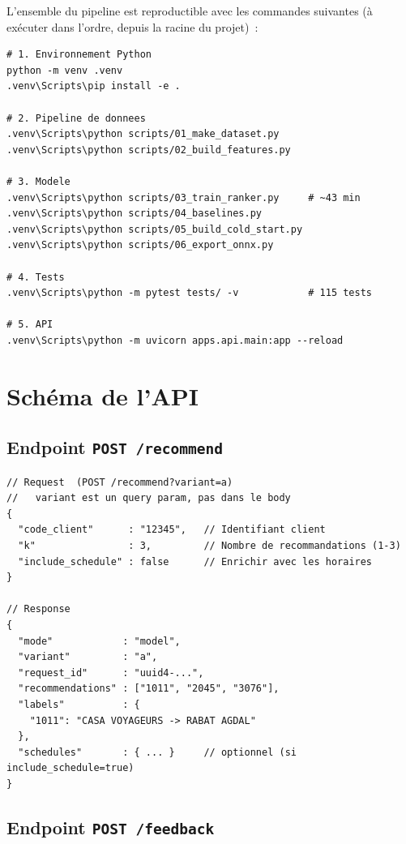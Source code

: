 \documentclass[12pt, a4paper]{report}
\begin{document}
L'ensemble du pipeline est reproductible avec les commandes suivantes
(à exécuter dans l'ordre, depuis la racine du projet)~:

\begin{lstlisting}[style=bash, caption={Pipeline de reproduction complet}]
# 1. Environnement Python
python -m venv .venv
.venv\Scripts\pip install -e .

# 2. Pipeline de donnees
.venv\Scripts\python scripts/01_make_dataset.py
.venv\Scripts\python scripts/02_build_features.py

# 3. Modele
.venv\Scripts\python scripts/03_train_ranker.py     # ~43 min
.venv\Scripts\python scripts/04_baselines.py
.venv\Scripts\python scripts/05_build_cold_start.py
.venv\Scripts\python scripts/06_export_onnx.py

# 4. Tests
.venv\Scripts\python -m pytest tests/ -v            # 115 tests

# 5. API
.venv\Scripts\python -m uvicorn apps.api.main:app --reload
\end{lstlisting}

\chapter{Schéma de l'API}

\section{Endpoint \texttt{POST /recommend}}

\begin{lstlisting}[style=json, caption={Sch\'ema de requ\^ete /recommend}]
// Request  (POST /recommend?variant=a)
//   variant est un query param, pas dans le body
{
  "code_client"      : "12345",   // Identifiant client
  "k"                : 3,         // Nombre de recommandations (1-3)
  "include_schedule" : false      // Enrichir avec les horaires
}

// Response
{
  "mode"            : "model",
  "variant"         : "a",
  "request_id"      : "uuid4-...",
  "recommendations" : ["1011", "2045", "3076"],
  "labels"          : {
    "1011": "CASA VOYAGEURS -> RABAT AGDAL"
  },
  "schedules"       : { ... }     // optionnel (si include_schedule=true)
}
\end{lstlisting}

\section{Endpoint \texttt{POST /feedback}}
\end{document}
